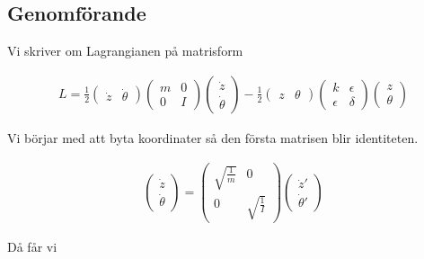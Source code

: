 \documentclass[a4paper]{article}
\begin{document}
\subsection{Genomförande}

Vi skriver om Lagrangianen på matrisform

\begin{align*}
    L = \frac{1}{2} \begin{pmatrix} \dot{z} & \dot{\theta} \end{pmatrix} \begin{pmatrix} m & 0 \\ 0 & I \end{pmatrix} \begin{pmatrix} \dot{z} \\ \dot{\theta} \end{pmatrix} - \frac{1}{2} \begin{pmatrix} z & \theta \end{pmatrix} \begin{pmatrix} k & \epsilon \\ \epsilon & \delta \end{pmatrix} \begin{pmatrix} z \\ \theta \end{pmatrix}
\end{align*}

Vi börjar med att byta koordinater så den första matrisen blir identiteten.

\begin{align*}
    \begin{pmatrix}
        \dot{z} \\
        \dot{\theta}
    \end{pmatrix} = \begin{pmatrix}
        \sqrt{\frac{1}{m}} & 0 \\ 0 & \sqrt{\frac{1}{I}}
    \end{pmatrix}
    \begin{pmatrix}
        \dot{z}' \\
        \dot{\theta}'
    \end{pmatrix}
\end{align*}

Då får vi
\end{document}
